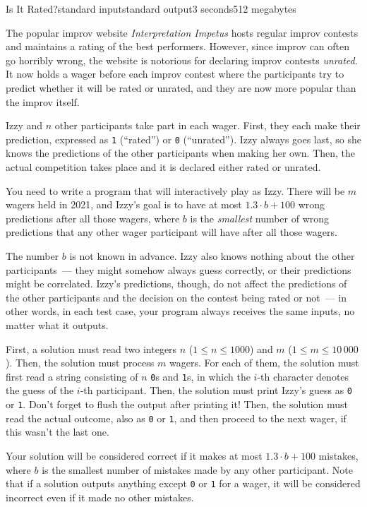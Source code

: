 \begin{problem}{Is It Rated?}{standard input}{standard output}{3 seconds}{512 megabytes}

The popular improv website \emph{Interpretation Impetus} hosts regular improv
contests and maintains a rating of the best performers. However, since improv can often go horribly wrong, the website is notorious for declaring improv contests \emph{unrated}. It now holds a wager before each improv contest where the participants try to predict whether it will be rated or unrated, and they are now more popular than the improv itself.

Izzy and $n$ other participants take part in each wager. First, they each make
their prediction, expressed as \texttt{1} (``rated'') or \texttt{0} (``unrated''). Izzy
always goes last, so she knows the predictions of the other participants when making
her own. Then, the actual competition takes place and it is declared either rated
or unrated.

You need to write a program that will interactively play as Izzy. There will be $m$ wagers held in 2021, and Izzy's goal is to have at most
$1.3\cdot b + 100$ wrong predictions after all those wagers, where $b$ is the \emph{smallest}
number of wrong predictions that any other wager participant will have after all those wagers. 

The number $b$ is not known in advance. Izzy also knows nothing about
the other participants~--- they might somehow always guess correctly, or their predictions might be correlated. Izzy's predictions, though, do not affect the predictions of the other participants and the decision on the contest being rated or not~--- in other words, in each test case, your program always receives the same inputs, no matter what it outputs.

\Interaction
First, a solution must read two integers $n$ ($1 \le n \le 1000$) and $m$ ($1 \le m \le 10\,000$). Then, the solution must process $m$ wagers. For each of them, the solution must first read a string consisting of $n$ \texttt{0}s and \texttt{1}s, in which the $i$-th character denotes the guess of the $i$-th participant. Then, the solution must print Izzy's guess as \texttt{0} or \texttt{1}.
Don't forget to flush the output after printing it! Then, the solution must read the actual outcome, also as \texttt{0} or \texttt{1}, and then proceed to the next wager, if this wasn't the last one. 

Your solution will be considered correct if it makes at most $1.3\cdot b + 100$ mistakes, where $b$ is the smallest number of mistakes made by any other participant. Note that if a solution outputs anything except \texttt{0} or \texttt{1} for a wager, it will be considered incorrect even if it made no other mistakes. 


\end{problem}
